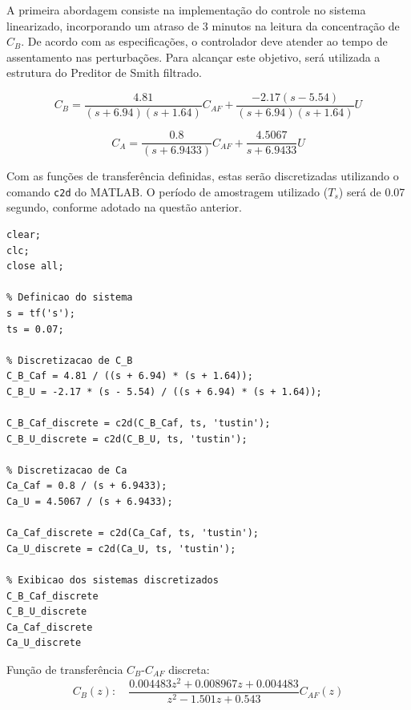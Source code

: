 \documentclass[a4paper,12pt]{article}
\begin{document}
A primeira abordagem consiste na implementação do controle no sistema linearizado, incorporando um atraso de 3 minutos na leitura da concentração de \(C_B\). De acordo com as especificações, o controlador deve atender ao tempo de assentamento nas perturbações. Para alcançar este objetivo, será utilizada a estrutura do Preditor de Smith filtrado.

\begin{equation}
C_B = \frac{4.81}{(s+6.94)(s+1.64)}C_{AF} +\frac{-2.17(s-5.54)}{(s+6.94)(s+1.64)} U
\end{equation}

\begin{equation}
C_A = \frac{0.8}{(s+6.9433)}C_{AF} +\frac{4.5067}{s+6.9433} U
\end{equation}

Com as funções de transferência definidas, estas serão discretizadas utilizando o comando \texttt{c2d} do MATLAB. O período de amostragem utilizado (\(T_s\)) será de 0.07 segundo, conforme adotado na questão anterior.\\



\begin{lstlisting}
clear;
clc;
close all;

% Definicao do sistema
s = tf('s');
ts = 0.07;

% Discretizacao de C_B
C_B_Caf = 4.81 / ((s + 6.94) * (s + 1.64));
C_B_U = -2.17 * (s - 5.54) / ((s + 6.94) * (s + 1.64));

C_B_Caf_discrete = c2d(C_B_Caf, ts, 'tustin');
C_B_U_discrete = c2d(C_B_U, ts, 'tustin');

% Discretizacao de Ca
Ca_Caf = 0.8 / (s + 6.9433);
Ca_U = 4.5067 / (s + 6.9433);

Ca_Caf_discrete = c2d(Ca_Caf, ts, 'tustin');
Ca_U_discrete = c2d(Ca_U, ts, 'tustin');

% Exibicao dos sistemas discretizados
C_B_Caf_discrete
C_B_U_discrete
Ca_Caf_discrete
Ca_U_discrete
\end{lstlisting}


Função de transferência \(C_B\)-\(C_{AF}\) discreta:\\

\begin{equation}
C_B(z): \quad \frac{0.004483 z^2 + 0.008967 z + 0.004483}{z^2 - 1.501 z + 0.543}C_{AF}(z)
\end{equation}\\
\end{document}

